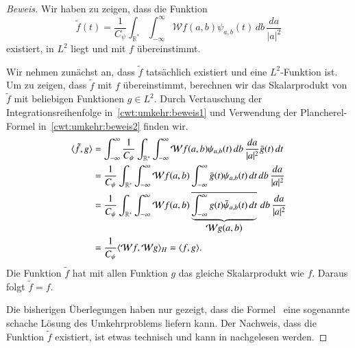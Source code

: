 \begin{proof}[Beweis]
Wir haben zu zeigen, dass die Funktion
\[
\tilde{f}(t) = \frac{1}{C_{\psi}}\int_{\mathbb R^*}\int_{-\infty}^\infty
\mathcal{W}f(a,b) \psi_{a,b}(t)
\,db\,\frac{da}{|a|^2}
\]
existiert, in $L^2$ liegt  und mit $f$ übereinstimmt.

Wir nehmen zunächst an, dass $\tilde{f}$ tatsächlich existiert und eine
$L^2$-Funktion ist.
Um zu zeigen, dass $\tilde{f}$ mit $f$ übereinstimmt, berechnen wir das
Skalarprodukt von $\tilde{f}$ mit beliebigen Funktionen $g\in L^2$.
Durch Vertauschung der Integrationsreihenfolge in~\eqref{cwt:umkehr:beweis1}
und Verwendung der Plancherel-Formel in~\eqref{cwt:umkehr:beweis2}
finden wir.
\begin{align}
\langle \tilde{f},g\rangle
&=
\int_{-\infty}^\infty
\frac1{C_{\psi}} \int_{\mathbb R^*}\int_{-\infty}^\infty
\mathcal{W}f(a,b)
\psi_{a,b}(t)
\,db\,\frac{da}{|a|^2}
\bar{g}(t)
\,dt
\notag
\\
&=
\frac1{C_{\psi}} \int_{\mathbb R^*}\int_{-\infty}^\infty
\mathcal{W}f(a,b)
\int_{-\infty}^\infty
\bar{g}(t)
\psi_{a,b}(t)
\,dt
\,db\,\frac{da}{|a|^2}
\label{cwt:umkehr:beweis1}
\\
&=
\frac1{C_{\psi}} \int_{\mathbb R^*}\int_{-\infty}^\infty
\mathcal{W}f(a,b)
\underbrace{
\overline{
\int_{-\infty}^\infty
g(t)
\bar{\psi}_{a,b}(t)
\,dt
}}_{\displaystyle\mathcal{W}g(a,b)}
\,db\,\frac{da}{|a|^2}
\notag
\\
&=
\frac{1}{C_{\psi}}
\langle \mathcal{W}f, \mathcal{W}g \rangle_H
=
\langle f, g\rangle.
\label{cwt:ummkehr:beweis2}
\end{align}
Die Funktion $\tilde{f}$ hat mit allen Funktion $g$ das gleiche Skalarprodukt
wie $f$.
Daraus folgt $\tilde{f}=f$.

Die bisherigen Überlegungen haben nur gezeigt, dass die
Formel~\label{cwt:umkehr} eine sogenannte schache Lösung des Umkehrproblems
liefern kann.
Der Nachweis, dass die Funktion $\tilde{f}$ existiert,
ist etwas technisch und kann
in \cite{buch:daubechies} nachgelesen werden.
\end{proof}




